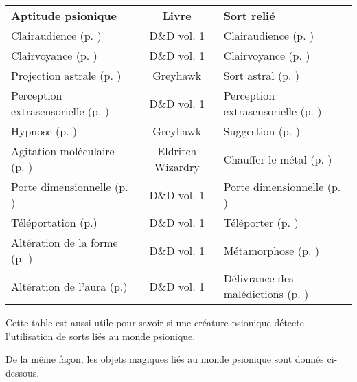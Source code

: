 \bigskip

\begin{tabular}{lcl}
\textbf{Aptitude psionique}                                     & \textbf{Livre}    & \textbf{Sort relié} \\
Clairaudience (p. \pageref{guerrier-clairaudience})             & D\&D vol. 1       & Clairaudience (p. \pageref{sort-clairaudience}) \\
Clairvoyance (p. \pageref{guerrier-clairvoyance})               & D\&D vol. 1       & Clairvoyance (p. \pageref{sort-clairvoyance}) \\
Projection astrale (p. \pageref{guerrier-projection-astrale})   & Greyhawk          & Sort astral (p. \pageref{sort-astral}) \\
Perception extrasensorielle (p. \pageref{magicien-ESP})         & D\&D vol. 1       & Perception extrasensorielle (p. \pageref{sort-esp}) \\
Hypnose (p. \pageref{magicien-hypnose})                         & Greyhawk          & Suggestion (p. \pageref{sort-suggestion}) \\
Agitation moléculaire (p. \pageref{magicien-agitation-mol})     & Eldritch Wizardry & Chauffer le métal (p. \pageref{sort-chauffe-metal}) \\
Porte dimensionnelle (p. \pageref{magicien-porte-dimensionnelle}) & D\&D vol. 1     & Porte dimensionnelle (p. \pageref{sort-porte-dimensionnelle}) \\
Téléportation (p.\pageref{magicien-teleportation})              & D\&D vol. 1       & Téléporter (p. \pageref{sort-teleporter}) \\
Altération de la forme (p. \pageref{magicien-alteration-forme}) & D\&D vol. 1       & Métamorphose (p. \pageref{sort-metamorphose}) \\
Altération de l'aura (p.\pageref{clerc-alteration-aura})        & D\&D vol. 1       & Délivrance des malédictions (p. \pageref{sort-delivrance-malediction}) \\
\end{tabular}

\bigskip

Cette table est aussi utile pour savoir si une créature psionique détecte l'utilisation de sorts liés au monde psionique.

\bigskip

De la même façon, les objets magiques liés au monde psionique sont donnés ci-dessous.

